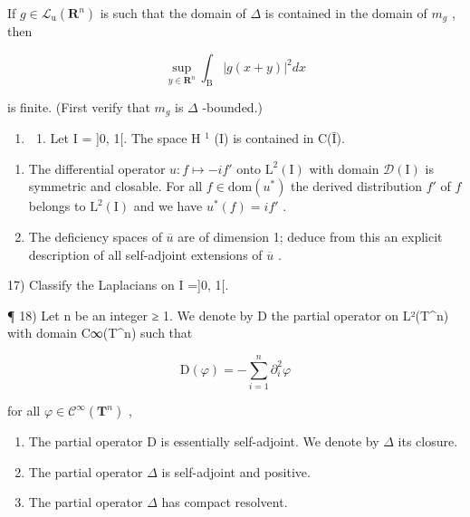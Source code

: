 If \(g \in \mathcal{L}_{\mathrm{u}}(\mathbf{R}^{n})\) is such that the domain of \(\Delta\) is contained in the domain of \(m_{g}\) , then

\[
\sup _ {y \in \mathbf {R} ^ {n}} \int_ {\mathrm{B}} | g (x + y) | ^ {2} d x
\]

is finite. (First verify that \(m_{g}\) is \(\Delta\) -bounded.)

\begin{enumerate}
\def\labelenumi{\arabic{enumi})}
\setcounter{enumi}{15}
\tightlist
\item
  \begin{enumerate}
  \def\labelenumii{\alph{enumii})}
  \tightlist
  \item
    Let I = {]}0, 1{[}. The space H \(^{1}\) (I) is contained in C(Ī).
  \end{enumerate}
\end{enumerate}

\begin{enumerate}
\def\labelenumi{\alph{enumi})}
\setcounter{enumi}{1}
\item
  The differential operator \(u\colon f\mapsto -if'\) onto \(\mathrm{L}^2 (\mathrm{I})\) with domain \(\mathcal{D}(\mathrm{I})\) is symmetric and closable. For all \(f\in \mathrm{dom}(u^{*})\) the derived distribution \(f'\) of \(f\) belongs to \(\mathrm{L}^2 (\mathrm{I})\) and we have \(u^{*}(f) = if'\) .
\item
  The deficiency spaces of \(\overline{u}\) are of dimension 1; deduce from this an explicit description of all self-adjoint extensions of \(\overline{u}\) .
\end{enumerate}

17) Classify the Laplacians on I ={]}0, 1{[}.

¶ 18) Let n be an integer ≥ 1. We denote by D the partial operator on L²(T\^{}n) with domain C∞(T\^{}n) such that

\[
\mathrm{D} (\varphi) = - \sum_ {i = 1} ^ {n} \partial_ {i} ^ {2} \varphi
\]

for all \(\varphi\in\mathcal{C}^{\infty}(\mathbf{T}^{n})\) ,

\begin{enumerate}
\def\labelenumi{\alph{enumi})}
\item
  The partial operator D is essentially self-adjoint. We denote by \(\Delta\) its closure.
\item
  The partial operator \(\Delta\) is self-adjoint and positive.
\item
  The partial operator \(\Delta\) has compact resolvent.
\end{enumerate}

